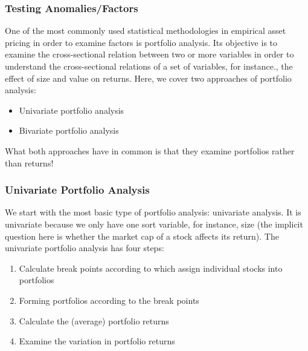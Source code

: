 \documentclass[xcolor=dvipsnames, english, 8pt]{beamer}
\begin{document}
\begin{frame}
    \frametitle{Testing Anomalies/Factors}
One of the most commonly used statistical methodologies in empirical asset pricing in order to examine factors is {\color{ubRed}portfolio analysis}. Its objective is to examine the cross-sectional relation between two or more variables in order to understand the cross-sectional relations of a set of variables, for instance., the effect of size and value on returns. Here, we cover two approaches of portfolio analysis:\vspace{0.25cm}\\
\begin{itemize}
    \item Univariate portfolio analysis
    \item Bivariate portfolio analysis\vspace{0.5cm}\\
\end{itemize}
What both approaches have in common is that they examine portfolios rather than returns!
\end{frame}



\begin{frame}
    \frametitle{Univariate Portfolio Analysis}
We start with the most basic type of portfolio analysis: univariate analysis. It is univariate because we only have one {\color{ubRed} sort variable}, for instance, size (the implicit question here is whether the market cap of a stock affects its return). The univariate portfolio analysis has four steps:\vspace{0.25cm}\\
\begin{enumerate}[1.]
    \item Calculate {\color{ubRed} break points} according to which assign individual stocks into portfolios
    \item Forming portfolios according to the break points
    \item Calculate the (average) portfolio returns
    \item Examine the variation in portfolio returns
\end{enumerate}
\end{frame}
\end{document}
